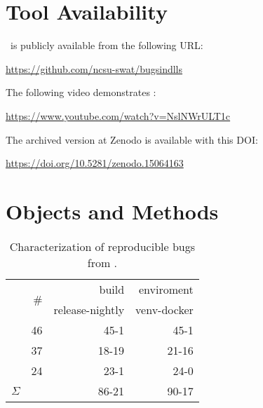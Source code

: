 \documentclass[sigconf,screen]{acmart}
\begin{document}

\section{Tool Availability}
\label{sec:tool-availability}
\tname\ is publicly available from the following URL:

\url{https://github.com/ncsu-swat/bugsindlls}

The following video demonstrates \tname:

\url{https://www.youtube.com/watch?v=NslNWrULT1c}

The archived version at Zenodo is available with this DOI:

\url{https://doi.org/10.5281/zenodo.15064163}\\


\section{Objects and Methods}

\begin{table}
  \centering
  \caption{\label{table:bug-characterization}Characterization of
    reproducible bugs from \tname.}
\begin{tabular}{l|rrr}
  \toprule & \multirow{2}{*}{\#} & \multicolumn{1}{r}{build} &
  \multicolumn{1}{r}{enviroment} \\ & & release-nightly & venv-docker
  \\ \cmidrule(lr){2-4} \jax{} & 46 & 45-1 & 45-1 \\ \torch{} & 37 &
  18-19 & 21-16 \\ \tf{} & 24 & 23-1 & 24-0 \\ \midrule
  \multicolumn{1}{c|}{$\Sigma$} & \numbugs{} & 86-21& 90-17
  \\ \bottomrule
\end{tabular}
\end{table}
\end{document}
